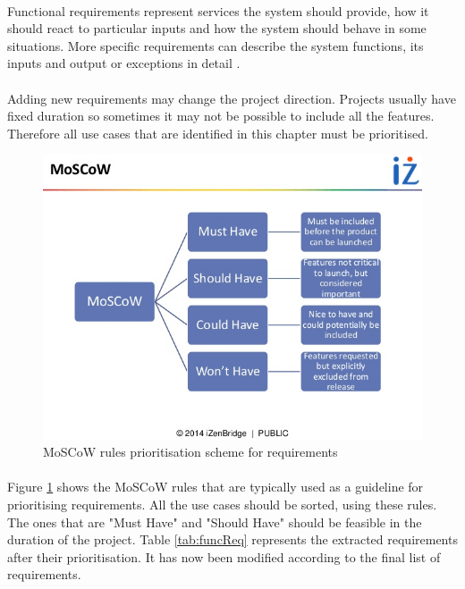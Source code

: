 \documentclass{l4proj}
\begin{document}
\paragraph{}
Functional requirements represent services the system should provide, how it should react to particular inputs and how the system should behave in some situations. More specific requirements can describe the system functions, its inputs and output or exceptions in detail \cite{sene}. 
\paragraph{}
Adding new requirements may change the project direction. Projects usually have fixed duration so sometimes it may not be possible to include all the features. Therefore all use cases that are identified in this chapter must be prioritised. 

\begin{figure}[H]
	\centering
	\includegraphics[width=.5\textwidth]{images/MoSCoW}
	\caption{MoSCoW rules prioritisation scheme for requirements}
	\label{MoSCoW}
\end{figure} 
\paragraph{}
Figure \ref{MoSCoW} shows the MoSCoW rules that are typically used as a guideline for prioritising requirements. All the use cases should be sorted, using these rules. The ones that are "Must Have" and "Should Have" should be feasible in the duration of the project. Table \ref{tab:funcReq} represents the extracted requirements after their prioritisation. It has now been modified according to the final list of requirements.
\end{document}
